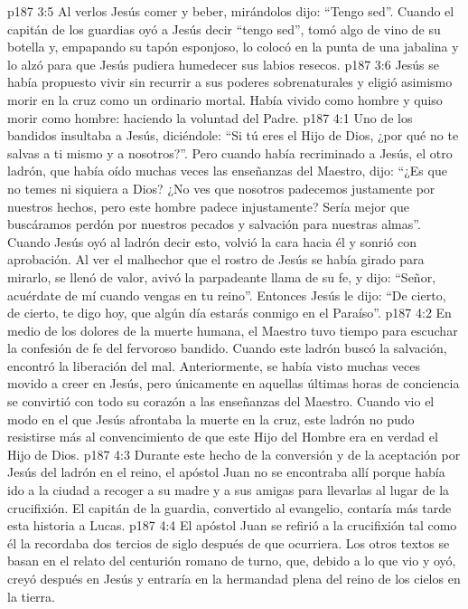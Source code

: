 \vs p187 3:5 Al verlos Jesús comer y beber, mirándolos dijo: “Tengo sed”. Cuando el capitán de los guardias oyó a Jesús decir “tengo sed”, tomó algo de vino de su botella y, empapando su tapón esponjoso, lo colocó en la punta de una jabalina y lo alzó para que Jesús pudiera humedecer sus labios resecos.
\vs p187 3:6 Jesús se había propuesto vivir sin recurrir a sus poderes sobrenaturales y eligió asimismo morir en la cruz como un ordinario mortal. Había vivido como hombre y quiso morir como hombre: haciendo la voluntad del Padre.
\vs p187 4:1 Uno de los bandidos insultaba a Jesús, diciéndole: “Si tú eres el Hijo de Dios, ¿por qué no te salvas a ti mismo y a nosotros?”. Pero cuando había recriminado a Jesús, el otro ladrón, que había oído muchas veces las enseñanzas del Maestro, dijo: “¿Es que no temes ni siquiera a Dios? ¿No ves que nosotros padecemos justamente por nuestros hechos, pero este hombre padece injustamente? Sería mejor que buscáramos perdón por nuestros pecados y salvación para nuestras almas”. Cuando Jesús oyó al ladrón decir esto, volvió la cara hacia él y sonrió con aprobación. Al ver el malhechor que el rostro de Jesús se había girado para mirarlo, se llenó de valor, avivó la parpadeante llama de su fe, y dijo: “Señor, acuérdate de mí cuando vengas en tu reino”. Entonces Jesús le dijo: “De cierto, de cierto, te digo hoy, que algún día estarás conmigo en el Paraíso”.
\vs p187 4:2 En medio de los dolores de la muerte humana, el Maestro tuvo tiempo para escuchar la confesión de fe del fervoroso bandido. Cuando este ladrón buscó la salvación, encontró la liberación del mal. Anteriormente, se había visto muchas veces movido a creer en Jesús, pero únicamente en aquellas últimas horas de conciencia se convirtió con todo su corazón a las enseñanzas del Maestro. Cuando vio el modo en el que Jesús afrontaba la muerte en la cruz, este ladrón no pudo resistirse más al convencimiento de que este Hijo del Hombre era en verdad el Hijo de Dios.
\vs p187 4:3 \pc Durante este hecho de la conversión y de la aceptación por Jesús del ladrón en el reino, el apóstol Juan no se encontraba allí porque había ido a la ciudad a recoger a su madre y a sus amigas para llevarlas al lugar de la crucifixión. El capitán de la guardia, convertido al evangelio, contaría más tarde esta historia a Lucas.
\vs p187 4:4 El apóstol Juan se refirió a la crucifixión tal como él la recordaba dos tercios de siglo después de que ocurriera. Los otros textos se basan en el relato del centurión romano de turno, que, debido a lo que vio y oyó, creyó después en Jesús y entraría en la hermandad plena del reino de los cielos en la tierra.
